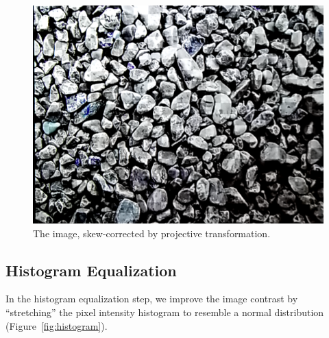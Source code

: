 \documentclass[11pt, letterpaper]{article}
\begin{document}
\begin{figure}[hbtp]
\centering
\includegraphics[scale=0.2]{img/skew2.png}
\caption{The image, skew-corrected by projective transformation.}
\label{fig:skew2}
\end{figure}

\subsection{Histogram Equalization}
In the histogram equalization step, we improve the image contrast by ``stretching'' the pixel intensity histogram to resemble a normal distribution (Figure~\ref{fig:histogram}).
\end{document}
